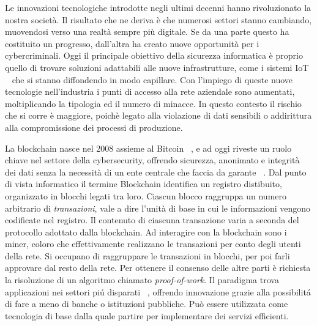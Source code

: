 


Le innovazioni tecnologiche introdotte negli ultimi decenni hanno rivoluzionato la nostra società. Il risultato che ne deriva è che numerosi settori stanno cambiando, muovendosi verso una realtà sempre più digitale. Se da una parte questo ha costituito un progresso, dall'altra ha creato nuove opportunità per i cybercriminali.\newline
\indent Oggi il principale obiettivo della sicurezza informatica è proprio quello di trovare soluzioni adattabili alle nuove infrastrutture, come i sistemi IoT ~\cite{KHAN2018395} che si stanno diffondendo in modo capillare. Con l'impiego di queste nuove tecnologie nell'industria i punti di accesso alla rete aziendale sono aumentati, moltiplicando la tipologia ed il numero di minacce. In questo contesto il rischio che si corre è maggiore, poichè legato alla violazione di dati sensibili o addirittura alla compromissione dei processi di produzione. %
\newline

La blockchain nasce nel 2008 assieme al Bitcoin ~\cite{nakamoto2008bitcoin}, e ad oggi riveste un ruolo chiave nel settore della cybersecurity, offrendo sicurezza, anonimato e integrità dei dati senza la necessità di un ente centrale che faccia da garante ~\cite{dai2017bitcoin}.\newline
\indent Dal punto di vista informatico il termine Blockchain identifica un registro distibuito, organizzato in blocchi legati tra loro. Ciascun blocco raggruppa un numero arbitrario di \textit{transazioni}, vale a dire l'unità di base in cui le informazioni vengono codificate nel registro. Il contenuto di ciascuna transazione varia a seconda del protocollo adottato dalla blockchain. Ad interagire con la blockchain sono i miner, coloro che effettivamente realizzano le transazioni per conto degli utenti della rete. Si occupano di raggruppare le transazioni in blocchi, per poi farli approvare dal resto della rete. Per ottenere il consenso delle altre parti è richiesta la risoluzione di un algoritmo chiamato \textit{proof-of-work}.\newline
\indent Il paradigma trova applicazioni nei settori piú disparati ~\cite{iansiti_lakhani_2017}, offrendo innovazione grazie alla possibilitá di fare a meno di banche o istituzioni pubbliche. Può essere utilizzata come tecnologia di base dalla quale partire per implementare dei servizi efficienti. %

